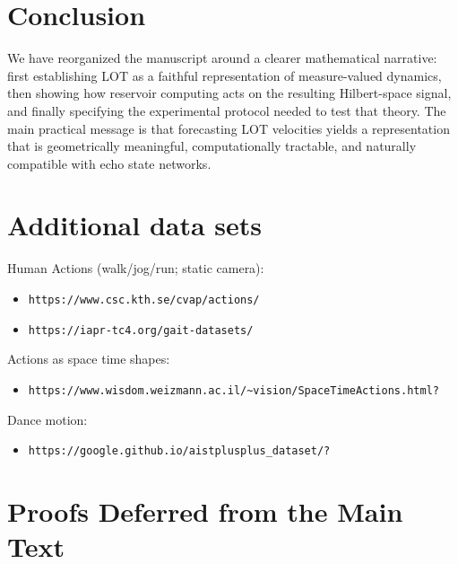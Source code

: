\documentclass[11pt]{article}
\newcommand{\1}{\mathbf{1}}
\begin{document}
\section{Conclusion}\label{sec:conclusion}
We have reorganized the manuscript around a clearer mathematical narrative: first establishing LOT as a faithful representation of measure-valued dynamics, then showing how reservoir computing acts on the resulting Hilbert-space signal, and finally specifying the experimental protocol needed to test that theory. The main practical message is that forecasting LOT velocities yields a representation that is geometrically meaningful, computationally tractable, and naturally compatible with echo state networks.

\section{Additional data sets}
 Human Actions (walk/jog/run; static camera):
\begin{itemize}
    \item \nolinkurl{https://www.csc.kth.se/cvap/actions/}
    \item \nolinkurl{https://iapr-tc4.org/gait-datasets/} \\
\end{itemize}

\noindent Actions as space time shapes: 
\begin{itemize}
    \item  \nolinkurl{https://www.wisdom.weizmann.ac.il/~vision/SpaceTimeActions.html?}
\end{itemize}

\noindent Dance motion:
\begin{itemize}
    \item \nolinkurl{https://google.github.io/aistplusplus_dataset/?}
\end{itemize}




\newpage 




\appendix

\section{Proofs Deferred from the Main Text}
\end{document}
